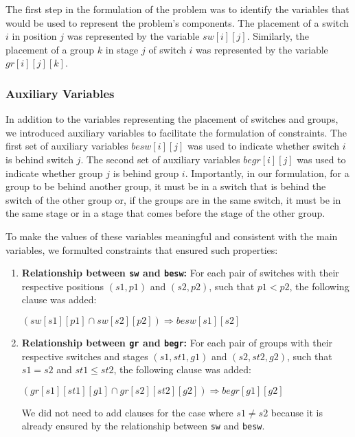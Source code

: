 The first step in the formulation of the problem was to identify the variables that would be used to represent the problem's components. The placement of a switch \(i\) in position \(j\) was represented by the variable \(sw[i][j]\). Similarly, the placement of a group \(k\) in stage \(j\) of switch \(i\) was represented by the variable \(gr[i][j][k]\).

\subsubsection{Auxiliary Variables}

In addition to the variables representing the placement of switches and groups, we introduced auxiliary variables to facilitate the formulation of constraints. The first set of auxiliary variables \(besw[i][j]\) was used to indicate whether switch \(i\) is behind switch \(j\). The second set of auxiliary variables \(begr[i][j]\) was used to indicate whether group \(j\) is behind group \(i\). Importantly, in our formulation, for a group to be behind another group, it must be in a switch that is behind the switch of the other group or, if the groups are in the same switch, it must be in the same stage or in a stage that comes before the stage of the other group.

To make the values of these variables meaningful and consistent with the main variables, we formulted constraints that ensured such properties:

\begin{enumerate}
    \item \textbf{Relationship between \texttt{sw} and \texttt{besw}:} For each pair of switches with their respective positions \((s1, p1)\) and \((s2, p2)\), such that \(p1 < p2\), the following clause was added:
    \begin{center}
        \((sw[s1][p1] \cap sw[s2][p2]) \Rightarrow besw[s1][s2]\)
    \end{center}

    \item \textbf{Relationship between \texttt{gr} and \texttt{begr}:} For each pair of groups with their respective switches and stages \((s1, st1, g1)\) and \((s2, st2, g2)\), such that \(s1 = s2\) and \(st1 \leq st2\), the following clause was added:
    \begin{center}
        \((gr[s1][st1][g1] \cap gr[s2][st2][g2]) \Rightarrow begr[g1][g2]\)
    \end{center}
    We did not need to add clauses for the case where \(s1 \neq s2\) because it is already ensured by the relationship between \texttt{sw} and \texttt{besw}.
\end{enumerate}

